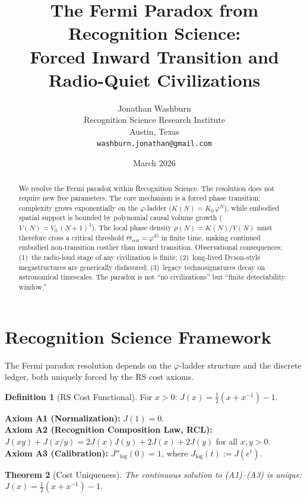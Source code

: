 \documentclass[12pt,a4paper]{article}
\title{The Fermi Paradox from Recognition Science:\\
Forced Inward Transition and Radio-Quiet Civilizations}
\author{Jonathan Washburn\\
Recognition Science Research Institute\\
Austin, Texas\\
\texttt{washburn.jonathan@gmail.com}}
\date{March 2026}
\newtheorem{theorem}{Theorem}[section]
\theoremstyle{definition}
\newtheorem{definition}[theorem]{Definition}
\theoremstyle{remark}
\begin{document}
\maketitle

\begin{abstract}
We resolve the Fermi paradox within Recognition Science.  The
resolution does not require new free parameters.  The core mechanism
is a forced phase transition: complexity grows exponentially on the
$\varphi$-ladder ($K(N) = K_0\,\varphi^N$), while embodied spatial
support is bounded by polynomial causal volume growth
($V(N) = V_0\,(N+1)^3$).  The local phase density
$\rho(N) = K(N)/V(N)$ must therefore cross a critical threshold
$\Theta_{\mathrm{crit}} = \varphi^{45}$ in finite time, making
continued embodied non-transition costlier than inward transition.
Observational consequences: (1)~the radio-loud stage of any
civilization is finite; (2)~long-lived Dyson-style megastructures
are generically disfavored; (3)~legacy technosignatures decay on
astronomical timescales.  The paradox is not ``no civilizations'' but
``finite detectability window.''
\end{abstract}

\section{Recognition Science Framework}
\label{sec:framework}

The Fermi paradox resolution depends on the $\varphi$-ladder structure
and the discrete ledger, both uniquely forced by the RS cost axioms.

\begin{definition}[RS Cost Functional]
For $x > 0$: $J(x) = \tfrac{1}{2}(x + x^{-1}) - 1$.
\end{definition}

\noindent\textbf{Axiom A1 (Normalization):} $J(1) = 0$.\\
\textbf{Axiom A2 (Recognition Composition Law, RCL):}
$J(xy)+J(x/y)=2J(x)J(y)+2J(x)+2J(y)$ for all $x,y>0$.\\
\textbf{Axiom A3 (Calibration):} $J''_{\log}(0) = 1$, where
$J_{\log}(t) := J(e^t)$.

\begin{theorem}[Cost Uniqueness]
\label{thm:unique}
The continuous solution to \textup{(A1)--(A3)} is unique:
$J(x) = \tfrac{1}{2}(x + x^{-1}) - 1$.
\end{theorem}
\end{document}
